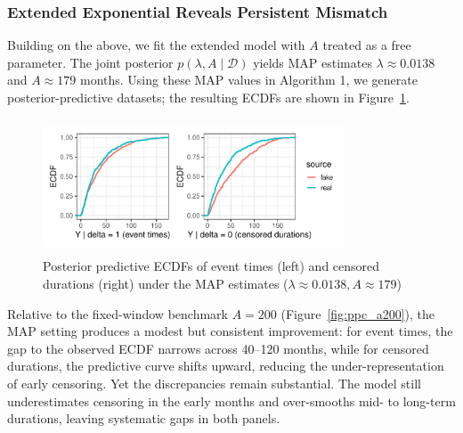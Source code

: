 \begin{table}[H]
\centering
\caption{{\small Event and censoring counts in real and simulated datasets (model checking)}}
\label{tab:modelcheck_counts}
\small 
{}
\end{table}
\subsubsection{Extended Exponential Reveals Persistent Mismatch}
Building on the above, we fit the extended model with $A$ treated as a free parameter. The joint posterior $p(\lambda, A\mid\mathcal D)$ yields MAP estimates $\lambda \approx 0.0138$ and $A \approx 179$ months. Using these MAP values in Algorithm 1, we generate posterior-predictive datasets; the resulting ECDFs are shown in Figure~\ref{fig:ppc_map}.
\begin{figure}[H]
    \centering
    \includegraphics[height=4cm, width=0.8\textwidth]{images/ppc_two_map.pdf}
    \caption{{\small Posterior predictive ECDFs of event times (left) and censored durations (right) under the MAP estimates ($\lambda \approx 0.0138, A \approx 179$)}}
    \label{fig:ppc_map}
\end{figure}
Relative to the fixed-window benchmark $A=200$ (Figure~\ref{fig:ppc_a200}), the MAP setting produces a modest but consistent improvement: for event times, the gap to the observed ECDF narrows across 40–120 months, while for censored durations, the predictive curve shifts upward, reducing the under-representation of early censoring. Yet the discrepancies remain substantial. The model still underestimates censoring in the early months and over-smooths mid- to long-term durations, leaving systematic gaps in both panels.

